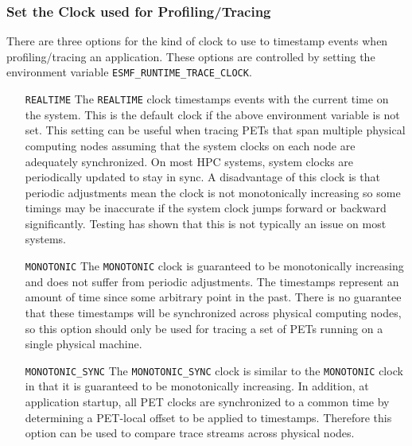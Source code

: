 \subsubsection{Set the Clock used for Profiling/Tracing}
\label{sec:TracingClocks}

There are three options for the kind of clock to use to timestamp
events when profiling/tracing an application.
These options are controlled by setting the environment variable
{\tt ESMF\_RUNTIME\_TRACE\_CLOCK}.
\begin{itemize}
\item [{\tt REALTIME}] The {\tt REALTIME} clock timestamps events with the current time on
      the system.  This is the default clock if the above environment
      variable is not set.  This setting can be useful when tracing PETs that
      span multiple physical computing nodes assuming that the system clocks
      on each node are adequately synchronized.  On most HPC systems, system
      clocks are periodically updated to stay in sync.  A disadvantage of this
      clock is that periodic adjustments mean the clock is not monotonically
      increasing so some timings may be inaccurate if the system clock jumps
      forward or backward significantly. Testing has shown that this is not
      typically an issue on most systems.
\item [{\tt MONOTONIC}] The {\tt MONOTONIC} clock is guaranteed to be monotonically increasing
      and does not suffer from periodic adjustments.  The timestamps represent
      an amount of time since some arbitrary point in the past.  There is no
      guarantee that these timestamps will be synchronized across physical
      computing nodes, so this option should only be used for tracing a set of PETs
      running on a single physical machine.
\item [{\tt MONOTONIC\_SYNC}] The {\tt MONOTONIC\_SYNC} clock is similar to the {\tt MONOTONIC} clock
      in that it is guaranteed to be monotonically increasing. In addition, at
      application startup, all PET clocks are synchronized to a common time
      by determining a PET-local offset to be applied to timestamps. Therefore this option
      can be used to compare trace streams across physical nodes.
\end{itemize}
